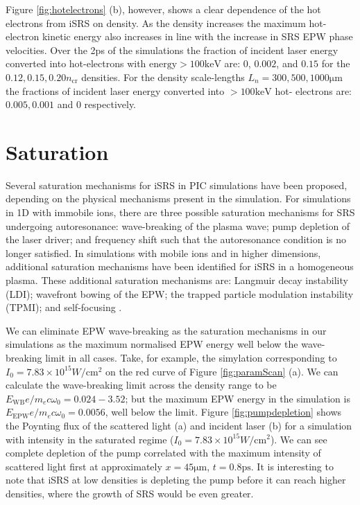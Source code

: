 Figure \ref{fig:hotelectrons} (b), however, shows a clear dependence of the hot
electrons from iSRS on density. As the density increases the maximum hot-
electron kinetic energy also increases in line with the increase in SRS EPW
phase velocities.
Over the 2ps of the simulations the fraction of incident laser energy converted
into hot-electrons with $\mathrm{energy} > 100\si{\kilo \electronvolt}$ are: 0,
$0.002$, and $0.15$ for the $0.12,0.15,0.20 n_\mathrm{cr}$ densities. For the
density scale-lengths $L_n=300,500,1000\si{\micro\metre}$ the fractions of
incident laser energy converted into $> 100\si{\kilo \electronvolt}$ hot-
electrons are: $0.005,0.001$ and $0$ respectively.





\section{Saturation}

Several saturation mechanisms for iSRS in PIC simulations have been proposed, depending on the physical mechanisms present in the simulation. For simulations in 1D with immobile ions, there are three possible saturation mechanisms for SRS undergoing autoresonance: wave-breaking of the plasma wave; pump depletion of the laser driver; and frequency shift such that the autoresonance condition is no longer satisfied. In simulations with mobile ions and in higher dimensions, additional saturation mechanisms have been identified for iSRS in a homogeneous plasma. These additional saturation mechanisms are: Langmuir decay instability (\acrshort{LDI}); wavefront bowing of the EPW; the trapped particle modulation instability (\acrshort{TPMI}); and self-focusing \citep{Yin2007}.

We can eliminate EPW wave-breaking as the saturation mechanisms in our simulations as the maximum normalised EPW energy well below the wave-breaking limit in all cases. Take, for example, the simylation corresponding to $I_0 = 7.83\times10^{15} \si{W/\centi\metre^2}$ on the red curve of Figure \ref{fig:paramScan} (a). We can calculate the wave-breaking limit across the density range to be $E_{\text{WB}} e/m_ec\omega_0 = 0.024 - 3.52 $; but the maximum EPW energy in the simulation is $E_{\text{EPW}} e/m_ec\omega_0 = 0.0056$, well below the limit.
Figure \ref{fig:pumpdepletion} shows the Poynting flux of the scattered light (a) and incident laser (b) for a simulation with intensity in the saturated regime ($I_0 = 7.83\times10^{15} \si{W/\centi\metre^2}$). We can see complete depletion of the pump correlated with the maximum intensity of scattered light first at approximately $x=45\si{\micro\metre}$, $t=0.8\si{\pico\second}$. It is interesting to note that iSRS at low densities is depleting the pump before it can reach higher densities, where the growth of SRS would be even greater. 

